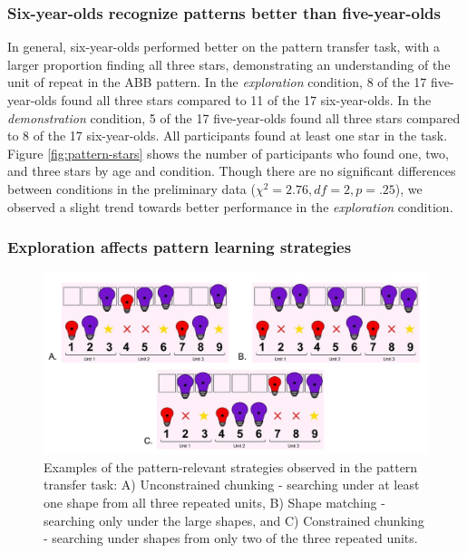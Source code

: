 \subsubsection{Six-year-olds recognize patterns better than five-year-olds}
In general, six-year-olds performed better on the pattern transfer task, with a larger proportion finding all three stars, demonstrating an understanding of the unit of repeat in the ABB pattern. In the \textit{exploration} condition, 8 of the 17 five-year-olds found all three stars compared to 11 of the 17 six-year-olds. In the \textit{demonstration} condition, 5 of the 17 five-year-olds found all three stars compared to 8 of the 17 six-year-olds. All participants found at least one star in the task. Figure \ref{fig:pattern-stars} shows the number of participants who found one, two, and three stars by age and condition. Though there are no significant differences between conditions in the preliminary data ($\chi^2=2.76, df=2, p=.25$), we observed a slight trend towards better performance in the \textit{exploration} condition.

\subsubsection{Exploration affects pattern learning strategies}

\begin{figure}
\centering
  \includegraphics[width=\textwidth]{future/figures/pattern_strat.jpg}
  \caption[Examples of the pattern-relevant strategies.]{Examples of the pattern-relevant strategies observed in the pattern transfer task: A) Unconstrained chunking - searching under at least one shape from all three repeated units, B) Shape matching - searching only under the large shapes, and C) Constrained chunking - searching under shapes from only two of the three repeated units.
}
  \label{fig:pattern-strat}
\end{figure}

